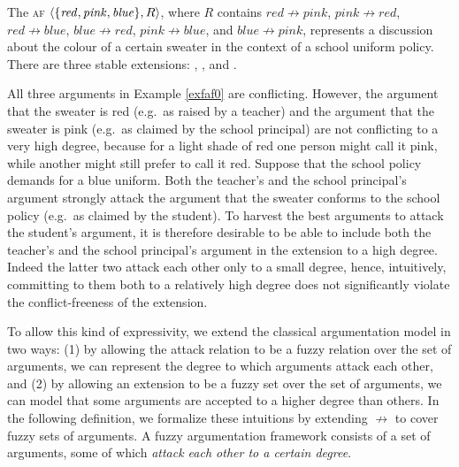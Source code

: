 \documentclass[12pt,a4paper]{article}
\newcommand{\attack}{\ensuremath{\not\rightarrow}}
\newcommand{\af}[2]{\ensuremath{\langle{#1},{#2}\rangle}}
\newcommand{\abaf}{\textsc{af}}
\begin{document}
\begin{example}\label{exfaf0}
The \abaf{} 
\af{\set{\mathit{red},\mathit{pink},\mathit{blue}}}{R},
where $R$ contains
$\mathit{red}\attack\mathit{pink}$,
$\mathit{pink}\attack\mathit{red}$,
$\mathit{red}\attack\mathit{blue}$,
$\mathit{blue}\attack\mathit{red}$,
$\mathit{pink}\attack\mathit{blue} $, and
$\mathit{blue}\attack\mathit{pink}$,
represents a discussion about the colour of a certain sweater in the context of a school uniform policy. There are three stable extensions:
,
,
and
. 
\end{example}
All three arguments in Example \ref{exfaf0} are conflicting. However,
the argument that the sweater is red (e.g.~as raised by a teacher) and
the argument that the sweater is pink (e.g.~as claimed by the school
principal) are not conflicting to a very high
degree, because for a light shade of red one person might call it pink,
while another might still prefer to call it red.  Suppose that the
school policy demands for a blue uniform. Both the teacher's and the
school principal's argument strongly attack the argument that the
sweater conforms to the school policy (e.g.~as claimed by the
student). To harvest the best arguments to attack the student's
argument, it is therefore desirable to be able to include both the
teacher's and the school principal's argument in the extension to a high degree.
Indeed the latter two attack each other only to a small
degree, hence, intuitively, committing to them both to a relatively
high degree does not significantly violate the conflict-freeness of the extension. 

To allow this kind of expressivity, we extend the classical argumentation model in two ways: (1) by allowing the attack relation to be a fuzzy relation over the set of arguments, we can represent the degree to which arguments attack each other, and (2) by allowing an extension to be a fuzzy set over the set of arguments, we can model that some arguments are accepted to a higher degree than others. 
In the following definition, we formalize these intuitions by
extending \attack{} to cover fuzzy sets of arguments. A fuzzy argumentation framework consists of a set of arguments, some of which {\em attack each other to a certain degree}.
\end{document}
